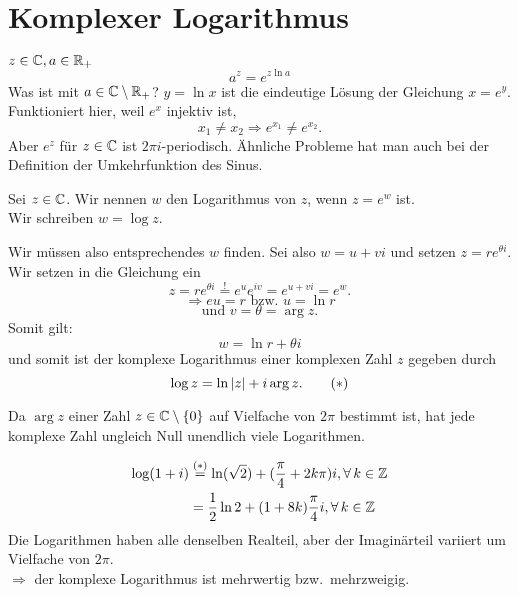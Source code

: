 \documentclass[../ana2u.tex]{subfiles}
\begin{document}
\setcounter{section}{0}

\section{Komplexer Logarithmus}

\( z\in\mathbb{C}, a\in\mathbb{R}_+ \)
\[ a^z = e^{z \ln a} \]
Was ist mit \( a \in \mathbb{C} \setminus \mathbb{R}_+ \)?
\( y = \ln x  \) ist die eindeutige Lösung der Gleichung 
\( x=e^y \).\\
Funktioniert hier, weil \(e^x\) injektiv ist, \dphp{}
\[ x_1 \neq x_2 \Rightarrow e^{x_1} \neq e^{x_2}. \]
Aber \( e^z \) für \( z\in\mathbb{C} \) ist 
\( 2\pi i \)-periodisch.
Ähnliche Probleme hat man auch bei der Definition 
der Umkehrfunktion des Sinus.
\begin{defi}
    Sei \( z \in \mathbb{C} \). Wir nennen \( w \) den 
    Logarithmus von \(z\), wenn \( z = e^w \) ist.\\
    Wir schreiben \( w = \log z \).
\end{defi}
Wir müssen also entsprechendes \(w\) finden.
Sei also \( w = u + vi \) und setzen 
\( z = r e^{\theta i} \). Wir setzen in die Gleichung 
ein 
\[ z = r e^{\theta i} \overset{!}{=} e^u e^{iv} 
= e^{u+vi} = e^w. \]
\[ \Rightarrow e u = r \text{ bzw. } u = \ln r \]
\[ \text{und } v = \theta = \arg z. \]
Somit gilt: \[ w = \ln r + \theta i \]
und somit ist der komplexe Logarithmus einer 
komplexen Zahl \(z\) gegeben durch 
\[ \log z = \ln \left|z\right| + i\arg z. \tag{\(*\)} \]
\begin{bem}
    Da \( \arg z \) einer Zahl 
    \( z \in \mathbb{C} \setminus \{0\} \)
    auf Vielfache von \( 2\pi \) 
    bestimmt ist, hat jede komplexe Zahl ungleich 
    Null unendlich viele Logarithmen.
\end{bem}
\begin{bsp}
    \begin{align*}
        \log(1+i) &\overset{(*)}{=} \ln(\sqrt{2}) 
        + (\frac{\pi}{4} + 2k\pi)i, \forall k \in \Z \\
        &= \frac{1}{2} \ln 2 + (1 + 8k) \frac{\pi}{4}i, 
        \forall k \in \Z \\
    \end{align*}
    Die Logarithmen haben alle denselben Realteil, aber 
    der Imaginärteil variiert um Vielfache von \( 2\pi \).\\
    \( \Rightarrow \) der komplexe Logarithmus ist 
    mehrwertig bzw.\ mehrzweigig.
\end{bsp}
\end{document}
